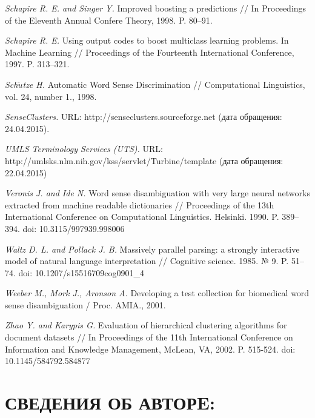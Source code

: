 \documentclass{article}
\begin{document}
\begin{articletext}
\begin{thebibliography}{9}
\textit{Schapire R. E. and Singer Y. }Improved boosting a predictions // In Proceedings of the Eleventh Annual Confere Theory, 1998. P. 80–91. 

\textit{Schapire R. E. }Using output codes to boost multiclass learning problems. In Machine Learning // Proceedings of the Fourteenth International Conference, 1997. P. 313–321. 

\textit{Sch$\ddot{u}$tze H. }Automatic Word Sense Discrimination // Computational Linguistics, vol. 24, number 1., 1998.

\textit{SenseClusters. }  \newline URL: http://senseclusters.sourceforge.net (дата обращения: 24.04.2015).

\textit{UMLS Terminology Services (UTS).} URL: http://umlsks.nlm.nih.gov/kss/servlet/Turbine/\newline template (дата обращения: 22.04.2015)

\textit{Veronis J. and Ide N. }Word  sense  disambiguation  with  very  large neural  networks  extracted  from machine readable dictionaries // Proceedings of the 13th International Conference on Computational Linguistics. Helsinki. 1990. P. 389–394. doi: 10.3115/997939.998006

\textit{Waltz D. L. and  Pollack J. B. }Massively parallel parsing: a strongly interactive  model  of  natural  language interpretation // Cognitive science. 1985. № 9. P. 51–74. doi: 10.1207/s15516709cog0901\_4
                     
\textit{Weeber M.,  Mork J.,  Aronson A. }Developing a test collection for biomedical word sense disambiguation / Proc. AMIA., 2001.

\textit{Zhao Y. and  Karypis G. }Evaluation of hierarchical clustering algorithms for document datasets // In Proceedings of the 11th International Conference on Information and Knowledge Management, McLean, VA, 2002. P. 515-524. doi: 10.1145/584792.584877



\end{thebibliography}
\end{articletext}


\section{СВЕДЕНИЯ ОБ АВТОРE:}
\end{document}
